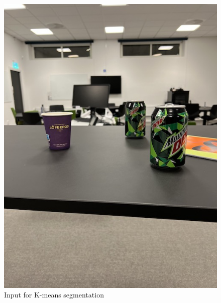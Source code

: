 \documentclass{article}
\begin{document}
\begin{figure}[H]
    \centering
    \includegraphics[width=1\textwidth]{im1.jpg} 
    \caption{Input for K-means segmentation}
    \label{fig:segOri}
\end{figure}
\end{document}
